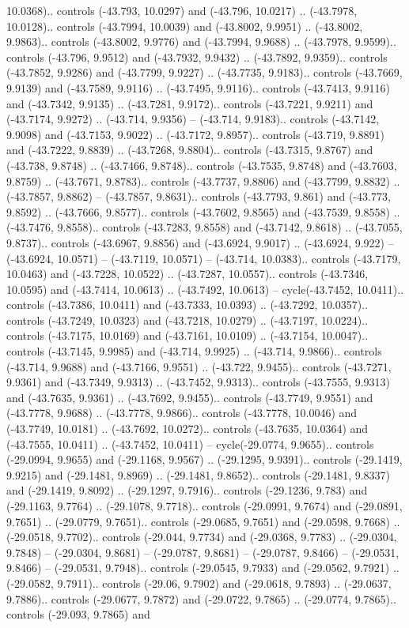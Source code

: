 \begin{scope}[shift={(2.5552, 9.9912)}]
\begin{scope}[shift={(48.1654, -14.8546)}]
10.0368).. controls (-43.793, 10.0297) and (-43.796, 10.0217) .. (-43.7978, 10.0128).. controls (-43.7994, 10.0039) and (-43.8002, 9.9951) .. (-43.8002, 9.9863).. controls (-43.8002, 9.9776) and (-43.7994, 9.9688) .. (-43.7978, 9.9599).. controls (-43.796, 9.9512) and (-43.7932, 9.9432) .. (-43.7892, 9.9359).. controls (-43.7852, 9.9286) and (-43.7799, 9.9227) .. (-43.7735, 9.9183).. controls (-43.7669, 9.9139) and (-43.7589, 9.9116) .. (-43.7495, 9.9116).. controls (-43.7413, 9.9116) and (-43.7342, 9.9135) .. (-43.7281, 9.9172).. controls (-43.7221, 9.9211) and (-43.7174, 9.9272) .. (-43.714, 9.9356) -- (-43.714, 9.9183).. controls (-43.7142, 9.9098) and (-43.7153, 9.9022) .. (-43.7172, 9.8957).. controls (-43.719, 9.8891) and (-43.7222, 9.8839) .. (-43.7268, 9.8804).. controls (-43.7315, 9.8767) and (-43.738, 9.8748) .. (-43.7466, 9.8748).. controls (-43.7535, 9.8748) and (-43.7603, 9.8759) .. (-43.7671, 9.8783).. controls (-43.7737, 9.8806) and (-43.7799, 9.8832) .. (-43.7857, 9.8862) -- (-43.7857, 9.8631).. controls (-43.7793, 9.861) and (-43.773, 9.8592) .. (-43.7666, 9.8577).. controls (-43.7602, 9.8565) and (-43.7539, 9.8558) .. (-43.7476, 9.8558).. controls (-43.7283, 9.8558) and (-43.7142, 9.8618) .. (-43.7055, 9.8737).. controls (-43.6967, 9.8856) and (-43.6924, 9.9017) .. (-43.6924, 9.922) -- (-43.6924, 10.0571) -- (-43.7119, 10.0571) -- (-43.714, 10.0383).. controls (-43.7179, 10.0463) and (-43.7228, 10.0522) .. (-43.7287, 10.0557).. controls (-43.7346, 10.0595) and (-43.7414, 10.0613) .. (-43.7492, 10.0613) -- cycle(-43.7452, 10.0411).. controls (-43.7386, 10.0411) and (-43.7333, 10.0393) .. (-43.7292, 10.0357).. controls (-43.7249, 10.0323) and (-43.7218, 10.0279) .. (-43.7197, 10.0224).. controls (-43.7175, 10.0169) and (-43.7161, 10.0109) .. (-43.7154, 10.0047).. controls (-43.7145, 9.9985) and (-43.714, 9.9925) .. (-43.714, 9.9866).. controls (-43.714, 9.9688) and (-43.7166, 9.9551) .. (-43.722, 9.9455).. controls (-43.7271, 9.9361) and (-43.7349, 9.9313) .. (-43.7452, 9.9313).. controls (-43.7555, 9.9313) and (-43.7635, 9.9361) .. (-43.7692, 9.9455).. controls (-43.7749, 9.9551) and (-43.7778, 9.9688) .. (-43.7778, 9.9866).. controls (-43.7778, 10.0046) and (-43.7749, 10.0181) .. (-43.7692, 10.0272).. controls (-43.7635, 10.0364) and (-43.7555, 10.0411) .. (-43.7452, 10.0411) -- cycle(-29.0774, 9.9655).. controls (-29.0994, 9.9655) and (-29.1168, 9.9567) .. (-29.1295, 9.9391).. controls (-29.1419, 9.9215) and (-29.1481, 9.8969) .. (-29.1481, 9.8652).. controls (-29.1481, 9.8337) and (-29.1419, 9.8092) .. (-29.1297, 9.7916).. controls (-29.1236, 9.783) and (-29.1163, 9.7764) .. (-29.1078, 9.7718).. controls (-29.0991, 9.7674) and (-29.0891, 9.7651) .. (-29.0779, 9.7651).. controls (-29.0685, 9.7651) and (-29.0598, 9.7668) .. (-29.0518, 9.7702).. controls (-29.044, 9.7734) and (-29.0368, 9.7783) .. (-29.0304, 9.7848) -- (-29.0304, 9.8681) -- (-29.0787, 9.8681) -- (-29.0787, 9.8466) -- (-29.0531, 9.8466) -- (-29.0531, 9.7948).. controls (-29.0545, 9.7933) and (-29.0562, 9.7921) .. (-29.0582, 9.7911).. controls (-29.06, 9.7902) and (-29.0618, 9.7893) .. (-29.0637, 9.7886).. controls (-29.0677, 9.7872) and (-29.0722, 9.7865) .. (-29.0774, 9.7865).. controls (-29.093, 9.7865) and 
\end{scope}
\end{scope}
